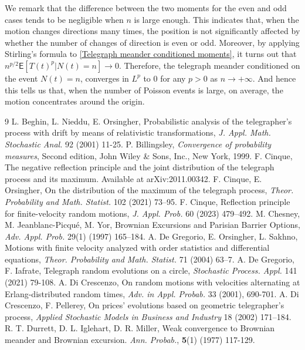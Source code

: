 \documentclass{article}
\theoremstyle{definition}
\numberwithin{equation}{section}
\begin{document}
We remark that the difference between the two moments for the even and odd cases tends to be negligible when $n$ is large enough. This indicates that, when the motion changes directions many times, the position is not significantly affected by whether the number of changes of direction is even or odd. Moreover, by applying Stirling's formula to \eqref{Telegraph meander conditioned moments}, it turns out that $n^{p/2}\mathsf{E}[T(t)^{p}|N(t) = n] \to 0$. Therefore, the telegraph meander conditioned on the event $N(t)=n$, converges in $L^p$ to $0$ for any $p>0$ as $n \to +\infty$. And hence this tells us that, when the number of Poisson events is large, on average, the motion concentrates around the origin.
\begin{thebibliography}{9}
 L. Beghin, L. Nieddu, E. Orsingher, Probabilistic analysis of the telegrapher’s process with drift by means of relativistic transformations, \textit{J. Appl. Math. Stochastic Anal.} 92 (2001) 11-25.
 P. Billingsley, \textit{Convergence of probability measures}, Second edition, John Wiley \& Sons, Inc., New York, 1999.
 F. Cinque, The negative reflection principle and the joint distribution of the telegraph process and its maximum. Available at arXiv:2011.00342.
 F. Cinque, E. Orsingher, On the distribution of the maximum of the telegraph process, \textit{Theor. Probability and Math. Statist.} 102 (2021) 73–95.
 F. Cinque, Reflection principle for finite-velocity random motions, \textit{J. Appl. Prob.} 60 (2023) 479–492.
 M. Chesney, M. Jeanblanc-Picqué, M. Yor, Brownian Excursions and Parisian Barrier Options, \textit{Adv. Appl. Prob.} 29(1) (1997) 165–184. 
 A. De Gregorio, E. Orsingher, L. Sakhno, Motions with finite velocity analyzed with order statistics and differential equations, \textit{Theor. Probability and Math. Statist.} 71 (2004) 63–7.
 A. De Gregorio, F. Iafrate, Telegraph random evolutions on a circle, \textit{Stochastic Process. Appl.} 141 (2021) 79-108.
 A. Di Crescenzo, On random motions with velocities alternating at Erlang-distributed random times, \textit{Adv. in Appl. Probab.} 33 (2001), 690-701.
 A. Di Crescenzo, F. Pellerey, On prices’ evolutions based on geometric telegrapher’s process, \textit{Applied Stochastic Models in Business and Industry} 18 (2002) 171–184.
 R. T. Durrett, D. L. Iglehart, D. R. Miller, Weak convergence to Brownian meander and Brownian excursion. \textit{Ann. Probab.}, \textbf{5}(1) (1977) 117-129.

\end{thebibliography}
\end{document}
